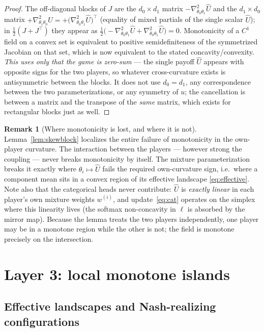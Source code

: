 \documentclass[11pt]{article}
\theoremstyle{definition}
\newtheorem{remark}{Remark}
\begin{document}
\begin{proof}
The off-diagonal blocks of $J$ are the $d_0 \times d_1$ matrix
$-\nabla^2_{\theta_0\theta_1}\widehat U$ and the $d_1 \times d_0$ matrix
$+\nabla^2_{\theta_1\theta_0}\widehat U = +\big(\nabla^2_{\theta_0\theta_1}
\widehat U\big)^{\!\top}$ (equality of mixed partials of the single scalar
$\widehat U$); in $\tfrac12(J + J^\top)$ they appear as
$\tfrac12\big({-}\nabla^2_{\theta_0\theta_1}\widehat U +
\nabla^2_{\theta_0\theta_1}\widehat U\big) = 0$. Monotonicity of a $C^1$ field
on a convex set is equivalent to positive semidefiniteness of the symmetrized
Jacobian on that set, which is now equivalent to the stated
concavity/convexity. \emph{This uses only that the game is zero-sum} --- the
single payoff $\widehat U$ appears with opposite signs for the two players, so
whatever cross-curvature exists is antisymmetric between the blocks. It does
not use $d_0 = d_1$, any correspondence between the two parameterizations, or
any symmetry of $u$; the cancellation is between a matrix and the transpose of
the \emph{same} matrix, which exists for rectangular blocks just as well.
\end{proof}

\begin{remark}[Where monotonicity is lost, and where it is not]
Lemma~\ref{lem:skewblock} localizes the entire failure of monotonicity in the
own-player curvature. The interaction between the players --- however strong the
coupling --- never breaks monotonicity by itself. The mixture parameterization
breaks it exactly where $\theta_i \mapsto \widehat U$ fails the required
own-curvature sign, i.e.\ where a component mean sits in a convex region of its
effective landscape \eqref{eq:effective}. Note also that the categorical heads
never contribute: $\widehat U$ is \emph{exactly linear} in each player's own
mixture weights $w^{(i)}$, and update~\eqref{eq:cat} operates on the simplex
where this linearity lives (the softmax non-concavity in $\ell$ is absorbed by
the mirror map). Because the lemma treats the two players independently, one
player may be in a monotone region while the other is not; the field is
monotone precisely on the intersection.
\end{remark}

\section{Layer 3: local monotone islands}\label{sec:local}

\subsection{Effective landscapes and Nash-realizing configurations}
\end{document}
